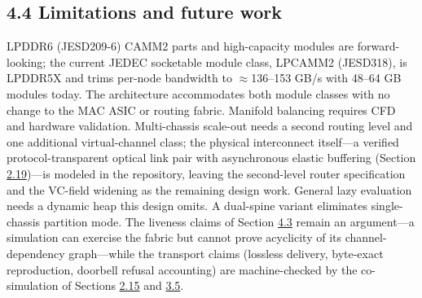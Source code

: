 \documentclass[10pt,twocolumn]{article}
\begin{document}
\subsection*{4.4 Limitations and future work}\label{sec:4.4}

LPDDR6 (JESD209-6)\cite{17} CAMM2 parts and high-capacity modules are forward-looking; the current JEDEC socketable module class, LPCAMM2 (JESD318), is LPDDR5X and trims per-node bandwidth to $\approx$136--153 GB/s with 48--64 GB modules today\cite{16,17}. The architecture accommodates both module classes with no change to the MAC ASIC or routing fabric. Manifold balancing requires CFD and hardware validation. Multi-chassis scale-out needs a second routing level and one additional virtual-channel class; the physical interconnect itself---a verified protocol-transparent optical link pair with asynchronous elastic buffering (Section \hyperref[sec:2.19]{2.19})---is modeled in the repository, leaving the second-level router specification and the VC-field widening as the remaining design work. General lazy evaluation needs a dynamic heap this design omits. A dual-spine variant eliminates single-chassis partition mode. The liveness claims of Section \hyperref[sec:4.3]{4.3} remain an argument---a simulation can exercise the fabric but cannot prove acyclicity of its channel-dependency graph\cite{9}---while the transport claims (lossless delivery, byte-exact reproduction, doorbell refusal accounting) are machine-checked by the co-simulation of Sections \hyperref[sec:2.15]{2.15} and \hyperref[sec:3.5]{3.5}.
\end{document}
